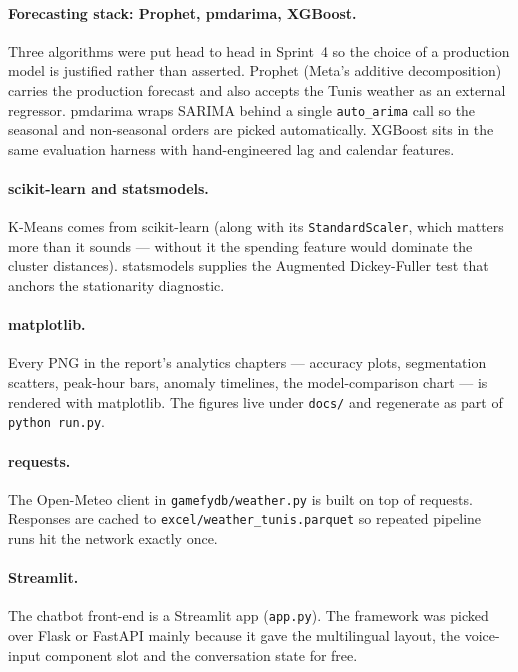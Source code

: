 \documentclass[12pt, a4paper]{report}
\begin{document}
\paragraph{Forecasting stack: Prophet, pmdarima, XGBoost.}
Three algorithms were put head to head in Sprint~4 so the choice of a
production model is justified rather than asserted. Prophet
(Meta's additive decomposition) carries the production forecast and
also accepts the Tunis weather as an external regressor. pmdarima
wraps SARIMA behind a single \texttt{auto\_arima} call so the
seasonal and non-seasonal orders are picked automatically. XGBoost
sits in the same evaluation harness with hand-engineered lag and
calendar features.

\paragraph{scikit-learn and statsmodels.} K-Means comes from
scikit-learn (along with its \texttt{StandardScaler}, which matters
more than it sounds --- without it the spending feature would dominate
the cluster distances). statsmodels supplies the Augmented
Dickey-Fuller test that anchors the stationarity diagnostic.

\paragraph{matplotlib.} Every PNG in the report's analytics chapters
--- accuracy plots, segmentation scatters, peak-hour bars, anomaly
timelines, the model-comparison chart --- is rendered with
matplotlib. The figures live under \texttt{docs/} and regenerate as
part of \texttt{python run.py}.

\paragraph{requests.} The Open-Meteo client in
\texttt{gamefydb/weather.py} is built on top of requests. Responses
are cached to \texttt{excel/weather\_tunis.parquet} so repeated
pipeline runs hit the network exactly once.

\paragraph{Streamlit.} The chatbot front-end is a Streamlit app
(\texttt{app.py}). The framework was picked over Flask or FastAPI
mainly because it gave the multilingual layout, the voice-input
component slot and the conversation state for free.
\end{document}
